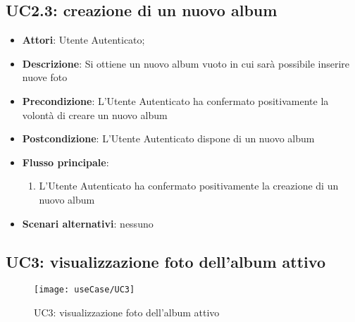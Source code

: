 
\subsection{UC2.3: creazione di un nuovo album}
\label{uc:uc2.3}

\begin{itemize}
  \item \textbf{Attori}: Utente Autenticato;
  \item \textbf{Descrizione}: Si ottiene un nuovo album vuoto in cui sarà
possibile inserire nuove foto
  \item \textbf{Precondizione}: L'Utente Autenticato ha confermato
positivamente la volontà di creare un nuovo album
  \item \textbf{Postcondizione}: L'Utente Autenticato dispone di un nuovo album
  \item \textbf{Flusso principale}:
  \begin{enumerate}
    \item L'Utente Autenticato ha confermato positivamente la creazione di un
nuovo album
  \end{enumerate}
  \item \textbf{Scenari alternativi}: nessuno
\end{itemize}



\newpage

\subsection{UC3: visualizzazione foto dell'album attivo}
\label{uc:uc3}


\begin{figure}[H]
  \centering
  \texttt{[image: useCase/UC3]}
  \caption{UC3: visualizzazione foto dell'album attivo}
\end{figure}

